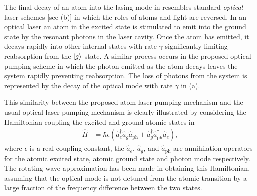 The final decay of an atom into the lasing mode in  resembles standard \emph{optical} laser schemes [see (b)] in which the roles of atoms and light are reversed.  In an optical laser an atom in the excited state is stimulated to emit into the ground state by the resonant photons in the laser cavity.  Once the atom has emitted, it decays rapidly into other internal states with rate $\gamma$ significantly limiting reabsorption from the ${\left|g\right>}$ state.  A similar process occurs in the proposed optical pumping scheme in which the photon emitted as the atom decays  leaves the system rapidly preventing reabsorption.  The loss of photons from the system is represented by the decay of the optical mode with rate $\gamma$ in (a).

This similarity between the proposed atom laser pumping mechanism and the usual optical laser pumping mechanism is clearly illustrated by considering the Hamiltonian coupling the excited and ground atomic states in 
\begin{align}
    \hat{H} &= \hbar \epsilon \left(\hat{a}_e^\dagger \hat{a}_g \hat{a}_\text{ph} + \hat{a}_g^\dagger \hat{a}_\text{ph}^\dagger \hat{a}_e  \right),
    \label{OpticalPumping:TwoLevelAtomHamiltonian}
\end{align}
where $\epsilon$ is a real coupling constant, the $\hat{a}_e$, $\hat{a}_g$, and $\hat{a}_\text{ph}$ are annihilation operators for the atomic excited state, atomic ground state and photon mode respectively.  The rotating wave approximation has been made in obtaining this Hamiltonian, assuming that the optical mode is not detuned from the atomic transition by a large fraction of the frequency difference between the two states.  

